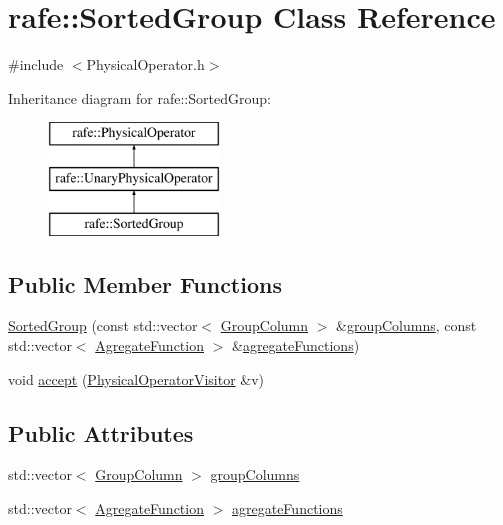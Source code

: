\hypertarget{classrafe_1_1_sorted_group}{\section{rafe\+:\+:Sorted\+Group Class Reference}
\label{classrafe_1_1_sorted_group}
}


{\ttfamily \#include $<$Physical\+Operator.\+h$>$}

Inheritance diagram for rafe\+:\+:Sorted\+Group\+:\begin{figure}[H]
\begin{center}
\leavevmode
\includegraphics[height=3.000000cm]{classrafe_1_1_sorted_group}
\end{center}
\end{figure}
\subsection*{Public Member Functions}
\begin{DoxyCompactItemize}
\item 
\hyperlink{classrafe_1_1_sorted_group_aa151ec63afeb0fa158d2cf2175c51ff6}{Sorted\+Group} (const std\+::vector$<$ \hyperlink{classrafe_1_1_group_column}{Group\+Column} $>$ \&\hyperlink{classrafe_1_1_sorted_group_a67bdbc2a6fda7e3f148e24c8fe44a169}{group\+Columns}, const std\+::vector$<$ \hyperlink{classrafe_1_1_agregate_function}{Agregate\+Function} $>$ \&\hyperlink{classrafe_1_1_sorted_group_a42df796f73825622fda8d4ff9d2b14eb}{agregate\+Functions})
\item 
void \hyperlink{classrafe_1_1_sorted_group_a2b9f2fbbe54f301a7b54050a67e1a4a2}{accept} (\hyperlink{classrafe_1_1_physical_operator_visitor}{Physical\+Operator\+Visitor} \&v)
\end{DoxyCompactItemize}
\subsection*{Public Attributes}
\begin{DoxyCompactItemize}
\item 
std\+::vector$<$ \hyperlink{classrafe_1_1_group_column}{Group\+Column} $>$ \hyperlink{classrafe_1_1_sorted_group_a67bdbc2a6fda7e3f148e24c8fe44a169}{group\+Columns}
\item 
std\+::vector$<$ \hyperlink{classrafe_1_1_agregate_function}{Agregate\+Function} $>$ \hyperlink{classrafe_1_1_sorted_group_a42df796f73825622fda8d4ff9d2b14eb}{agregate\+Functions}
\end{DoxyCompactItemize}


